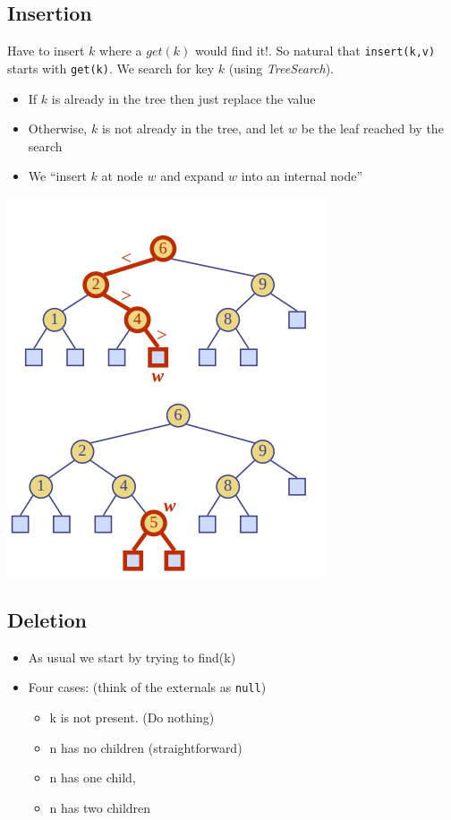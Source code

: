 \documentclass{article}
\begin{document}
	\subsection{Insertion}	
	\begin{flushleft}
		Have to insert $k$ where a $get(k)$ would find it!. So natural that \texttt{insert(k,v)} starts with \texttt{get(k)}. We search for key $k$ (using \textit{TreeSearch}).
		\begin{itemize}
			\item  If $k$ is already in the tree then just replace the value
			\item Otherwise, $k$ is not already in the tree, and let $w$ be the leaf reached by the search
			\item We “insert $k$ at node $w$ and expand $w$ into an internal node”
		\end{itemize}
	\end{flushleft}	
	\begin{center}
		\includegraphics[scale=0.5]{binary_insert.png}
	\end{center}
	
	\subsection{Deletion}	
	\begin{itemize}
		\item As usual we start by trying to find(k)
		\item Four cases: (think of the externals as \texttt{null})
		\begin{itemize}
			\item k is not present. (Do nothing)
			\item n has no children (straightforward)
			\item n has one child,
			\item n has two children
		\end{itemize}
	\end{itemize}
\end{document}
